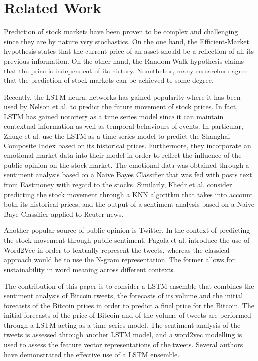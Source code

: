 \documentclass[conference]{IEEEtran}
\begin{document}
\section{Related Work}
\par Prediction of stock markets have been proven to be complex and challenging since they are by nature very stochastics. On the one hand, the Efficient-Market hypothesis states that the current price of an asset should be a reflection of all its previous information. On the other hand, the Random-Walk hypothesis claims that the price is independent of its history. Nonetheless, many researchers agree that the prediction of stock markets can be achieved to some degree.  
\par Recently, the LSTM neural networks has gained popularity where it has been used by Nelson et al. \cite{LSTM Stock} to predict the future movement of stock prices. In fact, LSTM has gained notoriety as a time series model since it can maintain contextual information as well as temporal behaviours of events. In particular, Zhuge et al. \cite{LSTM Emotional} use the LSTM as a time series model to predict the Shanghai Composite Index based on its historical prices. Furthermore, they incorporate an emotional market data into their model in order to reflect the influence of the public opinion on the stock market. The emotional data was obtained through a sentiment analysis based on a Naive Bayes Classifier that was fed with posts text from Eastmoney with regard to the stocks. Similarly, Khedr et al. \cite{Behavior}   consider predicting the stock movement through a KNN algorithm that takes into account both its historical prices, and the output of a sentiment analysis based on a Naive Baye Classifier applied to Reuter news. 
\par Another popular source of public opinion is Twitter. In the context of predicting the stock movement through public sentiment, Pagola et al. \cite{word2vec Twitter} introduce the use of Word2Vec in order to textually represent the tweets, whereas the classical approach would be to use the N-gram representation. The former allows for sustainability in word meaning across different contexts.
\par The contribution of this paper is to consider a LSTM ensemble that combines the sentiment analysis of Bitcoin tweets, the forecasts of its volume and the initial forecasts of the Bitcoin prices in order to predict a final price for the Bitcoin. The initial forecasts of the price of Bitcoin and of the volume of tweets are performed through a LSTM acting as a time series model. The sentiment analysis of the tweets is assessed through another LSTM model, and a word2vec modelling is used to assess the feature vector representations of the tweets. Several authors \cite{LSTM Ensemble 1} have demonstrated the effective use of a LSTM ensemble. 
\end{document}
